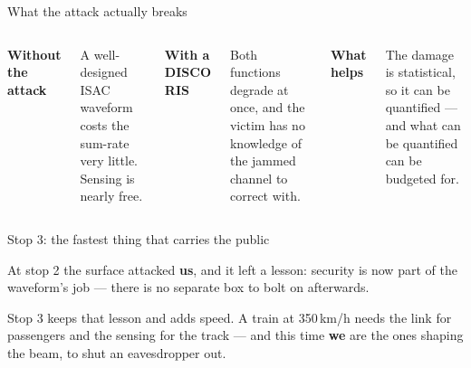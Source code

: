 \begin{frame}{What the attack actually breaks}
  \vspace{0.5em}
  \begin{columns}[T,onlytextwidth]
      {\small\textbf{\textcolor{softgray}{Without the attack}}\par}
      \vspace{0.4em}
      {\small A well-designed ISAC waveform costs the sum-rate very little. Sensing is
       nearly free.\par}
      {\small\textbf{\textcolor{ranpurple}{With a DISCO RIS}}\par}
      \vspace{0.4em}
      {\small Both functions degrade at once, and the victim has no knowledge of the
       jammed channel to correct with.\par}
      {\small\textbf{\textcolor{softgreen}{What helps}}\par}
      \vspace{0.4em}
      {\small The damage is statistical, so it can be quantified --- and what can be
       quantified can be budgeted for.\par}
  \end{columns}

  \vspace{0.8em}

  \vspace{0.2em}
\end{frame}

\begin{frame}{Stop 3: the fastest thing that carries the public}
  \vspace{0.4em}
  \centering

  \vspace{0.9em}
  {\small\raggedright At stop 2 the surface attacked \textbf{us}, and it left a
   lesson: security is now part of the waveform's job --- there is no separate
   box to bolt on afterwards.\par}

  \vspace{0.4em}
  {\small\raggedright Stop 3 keeps that lesson and adds speed. A train at
   350\,km/h needs the link for passengers and the sensing for the track --- and
   this time \textbf{we} are the ones shaping the beam, to shut an eavesdropper
   out.\par}
\end{frame}

